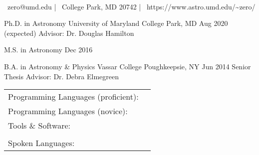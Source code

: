 \documentclass[]{awesome-cv}
\begin{document}
    
\begin{center}
	  \\
	\vspace{2mm}
	{\faEnvelope\ zero@umd.edu} | {\faMapMarker\ College Park, MD 20742} | {\faLink\ https://www.astro.umd.edu/\textasciitilde{}zero/}
\end{center}
\begin{cventries}
	\cventry
	{Ph.D. in Astronomy}
	{University of Maryland}
	{College Park, MD}
	{Aug 2020 (expected)}
	{Advisor: Dr. Douglas Hamilton}
	
	\vspace{-2mm}
	\cventry
	{M.S. in Astronomy}
	{}
	{}
	{Dec 2016}
	{}
	
	\vspace{-5mm}
	\cventry
	{B.A. in Astronomy \& Physics}
	{Vassar College}
	{Poughkeepsie, NY}
	{Jun 2014}
	{Senior Thesis Advisor: Dr. Debra Elmegreen}
\end{cventries}

\vspace{-2mm}

\begin{cventries}
	\cventry
	{}
	{\def\arraystretch{1.15}{\begin{tabular}{ l l }
		Programming Languages (proficient):  & {\skill{ Python, C, \LaTeX, Mathematica, shell scripting}} \\
		Programming Languages (novice):  & {\skill{ HTML/CSS}} \\
		Tools \& Software:  & {\skill{ Numpy, Matplotlib, Pandas, Scikit-learn, SciPy, Seaborn}} \\
		& {\skill{ Git, Jupyter Notebook, Microsoft Office, Slurm, Unix/Linux}} \\
		Spoken Languages:  & {\skill{ English (native), Hebrew (advanced)}}
		\end{tabular}}}
	{}
	{}
	{}
\end{cventries}
\end{document}

